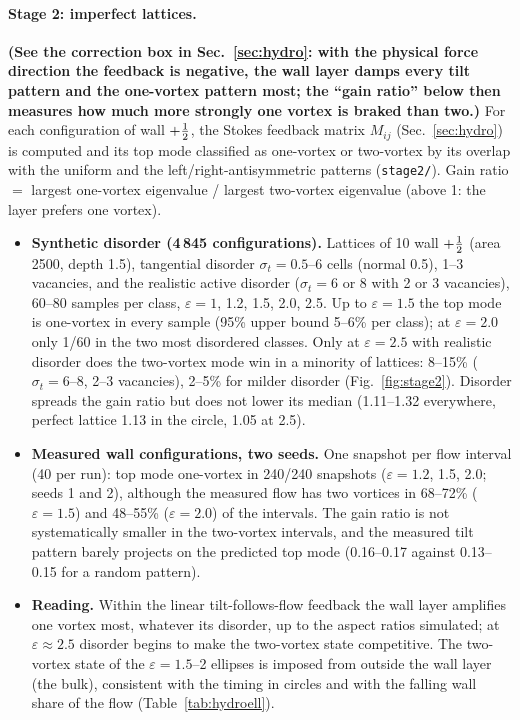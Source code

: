 \paragraph{Stage 2: imperfect lattices.} \textbf{(See the correction box in Sec.~\ref{sec:hydro}: with the physical force direction the feedback is negative, the wall layer damps
every tilt pattern and the one-vortex pattern most; the ``gain ratio'' below then measures how much more strongly one vortex is braked than two.)} For each configuration of wall $+\tfrac12$, the Stokes feedback matrix $M_{ij}$ (Sec.~\ref{sec:hydro}) is
computed and its top mode classified as one-vortex or two-vortex by its overlap with the uniform and the left/right-antisymmetric patterns
(\texttt{stage2/}). Gain ratio $=$ largest one-vortex eigenvalue / largest two-vortex eigenvalue (above 1: the layer prefers one vortex).
\begin{itemize}
  \item \textbf{Synthetic disorder (4\,845 configurations).} Lattices of 10 wall $+\tfrac12$ (area 2500, depth 1.5), tangential disorder
        $\sigma_t=0.5$--6 cells (normal 0.5), 1--3 vacancies, and the realistic active disorder ($\sigma_t=6$ or 8 with 2 or 3 vacancies), 60--80
        samples per class, $\varepsilon=1$, 1.2, 1.5, 2.0, 2.5. Up to $\varepsilon=1.5$ the top mode is one-vortex in every sample (95\% upper bound
        5--6\% per class); at $\varepsilon=2.0$ only 1/60 in the two most disordered classes. Only at $\varepsilon=2.5$ with realistic disorder does the
        two-vortex mode win in a minority of lattices: 8--15\% ($\sigma_t=6$--8, 2--3 vacancies), 2--5\% for milder disorder (Fig.~\ref{fig:stage2}).
        Disorder spreads the gain ratio but does not lower its median (1.11--1.32 everywhere, perfect lattice 1.13 in the circle, 1.05 at 2.5).
  \item \textbf{Measured wall configurations, two seeds.} One snapshot per flow interval (40 per run): top mode one-vortex in 240/240 snapshots
        ($\varepsilon=1.2$, 1.5, 2.0; seeds 1 and 2), although the measured flow has two vortices in 68--72\% ($\varepsilon=1.5$) and 48--55\%
        ($\varepsilon=2.0$) of the intervals. The gain ratio is not systematically smaller in the two-vortex intervals, and the measured tilt pattern
        barely projects on the predicted top mode (0.16--0.17 against 0.13--0.15 for a random pattern).
  \item \textbf{Reading.} Within the linear tilt-follows-flow feedback the wall layer amplifies one vortex most, whatever its disorder, up to the
        aspect ratios simulated; at $\varepsilon\approx2.5$ disorder begins to make the two-vortex state competitive. The two-vortex state of the
        $\varepsilon=1.5$--2 ellipses is imposed from outside the wall layer (the bulk), consistent with the timing in circles and with the falling wall
        share of the flow (Table~\ref{tab:hydroell}).
\end{itemize}
